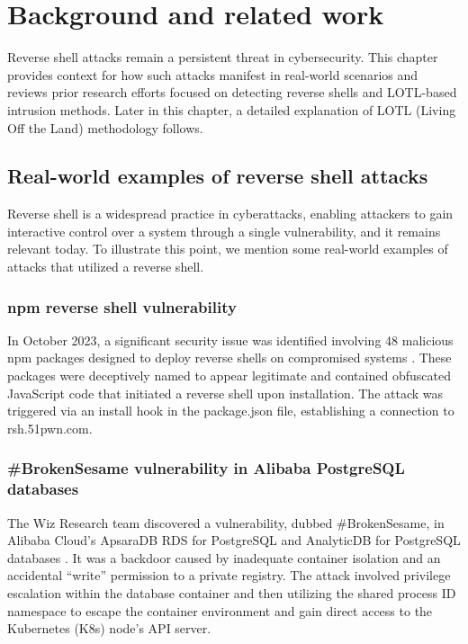 \chapter{Background and related work}

\label{chap:background}

Reverse shell attacks remain a persistent threat in cybersecurity. This chapter provides context for how such attacks manifest in real-world scenarios and reviews prior research efforts focused on detecting reverse shells and LOTL-based intrusion methods. Later in this chapter, a detailed explanation of LOTL (Living Off the Land) methodology follows.

\section{Real-world examples of reverse shell attacks}

Reverse shell is a widespread practice in cyberattacks, enabling attackers to gain interactive control over a system through a single vulnerability, and it remains relevant today. To illustrate this point, we mention some real-world examples of attacks that utilized a reverse shell. 


\subsection*{npm reverse shell vulnerability}

In October 2023, a significant security issue was identified involving 48 malicious npm packages designed to deploy reverse shells on compromised systems \cite{npm-vulnerability}. These packages were deceptively named to appear legitimate and contained obfuscated JavaScript code that initiated a reverse shell upon installation. The attack was triggered via an install hook in the package.json file, establishing a connection to rsh.51pwn.com.


\subsection*{\#BrokenSesame vulnerability in Alibaba PostgreSQL databases}

The Wiz Research team discovered a vulnerability, dubbed \#BrokenSesame, in Alibaba Cloud's ApsaraDB RDS for PostgreSQL and AnalyticDB for PostgreSQL databases \cite{BrokenSesame}. It was a backdoor caused by inadequate container isolation and an accidental ``write'' permission to a private registry. The attack involved privilege escalation within the database container and then utilizing the shared process ID namespace to escape the container environment and gain direct access to the Kubernetes (K8s) node's API server.

